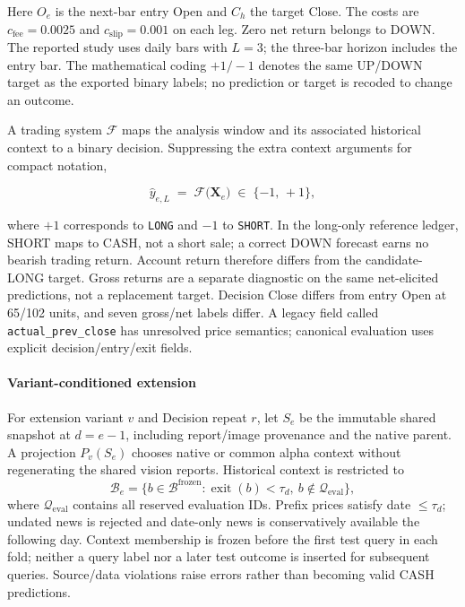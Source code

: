 Here $O_e$ is the next-bar entry Open and $C_h$ the target Close. The costs are $c_{\mathrm{fee}}=0.0025$ and $c_{\mathrm{slip}}=0.001$ on each leg. Zero net return belongs to DOWN. The reported study uses daily bars with $L=3$; the three-bar horizon includes the entry bar. The mathematical coding $+1/-1$ denotes the same UP/DOWN target as the exported binary labels; no prediction or target is recoded to change an outcome.

A trading system $\mathcal{F}$ maps the analysis window and its associated historical context to a binary decision. Suppressing the extra context arguments for compact notation,

\begin{equation}
    \hat{y}_{e,L} \;=\; \mathcal{F}\!\bigl(\mathbf{X}_e\bigr)
    \;\in\; \{-1,\, +1\},
\end{equation}


where $+1$ corresponds to \texttt{LONG} and $-1$ to \texttt{SHORT}. In the long-only reference ledger, SHORT maps to CASH, not a short sale; a correct DOWN forecast earns no bearish trading return. Account return therefore differs from the candidate-LONG target. Gross returns are a separate diagnostic on the same net-elicited predictions, not a replacement target. Decision Close differs from entry Open at 65/102 units, and seven gross/net labels differ. A legacy field called \texttt{actual\_prev\_close} has unresolved price semantics; canonical evaluation uses explicit decision/entry/exit fields.

\paragraph{Variant-conditioned extension}
For extension variant $v$ and Decision repeat $r$, let $S_e$ be the immutable shared snapshot at $d=e-1$, including report/image provenance and the native parent. A projection $P_v(S_e)$ chooses native or common alpha context without regenerating the shared vision reports. Historical context is restricted to
\begin{equation}
 \mathcal{B}_e=\{b\in\mathcal{B}^{\mathrm{frozen}}:\operatorname{exit}(b)<\tau_d,
                 \ b\notin\mathcal{Q}_{\mathrm{eval}}\},
 \label{eq:prior_cutoff}
\end{equation}
where $\mathcal{Q}_{\mathrm{eval}}$ contains all reserved evaluation IDs. Prefix prices satisfy date $\le\tau_d$; undated news is rejected and date-only news is conservatively available the following day. Context membership is frozen before the first test query in each fold; neither a query label nor a later test outcome is inserted for subsequent queries. Source/data violations raise errors rather than becoming valid CASH predictions.

